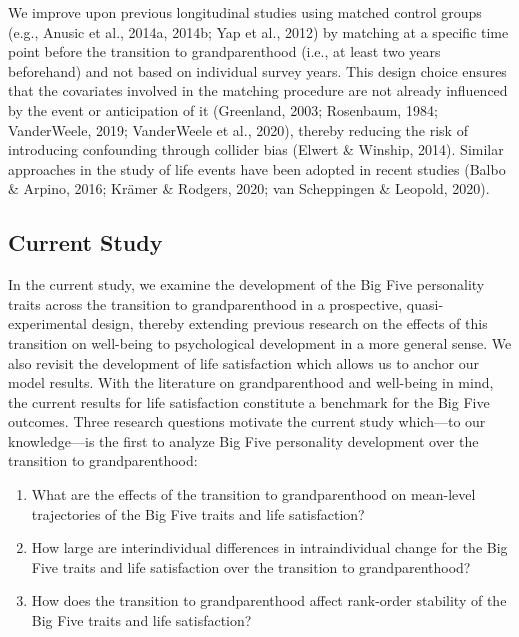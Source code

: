 \documentclass[
  english,
  man,floatsintext]{apa7}
\providecommand{\tightlist}{%
  \setlength{\itemsep}{0pt}\setlength{\parskip}{0pt}}
\begin{document}
We improve upon previous longitudinal studies using matched control groups (e.g., Anusic et al., 2014a, 2014b; Yap et al., 2012) by matching at a specific time point before the transition to grandparenthood (i.e., at least two years beforehand) and not based on individual survey years. This design choice ensures that the covariates involved in the matching procedure are not already influenced by the event or anticipation of it (Greenland, 2003; Rosenbaum, 1984; VanderWeele, 2019; VanderWeele et al., 2020), thereby reducing the risk of introducing confounding through collider bias (Elwert \& Winship, 2014). Similar approaches in the study of life events have been adopted in recent studies (Balbo \& Arpino, 2016; Krämer \& Rodgers, 2020; van Scheppingen \& Leopold, 2020).

\hypertarget{current-study}{%
\subsection{Current Study}\label{current-study}}

In the current study, we examine the development of the Big Five personality traits across the transition to grandparenthood in a prospective, quasi-experimental design, thereby extending previous research on the effects of this transition on well-being to psychological development in a more general sense. We also revisit the development of life satisfaction which allows us to anchor our model results. With the literature on grandparenthood and well-being in mind, the current results for life satisfaction constitute a benchmark for the Big Five outcomes. Three research questions motivate the current study which---to our knowledge---is the first to analyze Big Five personality development over the transition to grandparenthood:

\begin{enumerate}
\def\labelenumi{\arabic{enumi}.}
\tightlist
\item
  What are the effects of the transition to grandparenthood on mean-level trajectories of the Big Five traits and life satisfaction?
\item
  How large are interindividual differences in intraindividual change for the Big Five traits and life satisfaction over the transition to grandparenthood?
\item
  How does the transition to grandparenthood affect rank-order stability of the Big Five traits and life satisfaction?
\end{enumerate}
\end{document}
